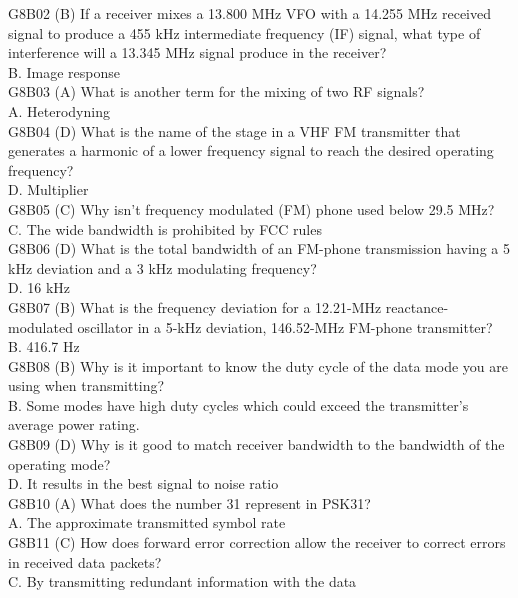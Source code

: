 \documentclass[12pt,letterpaper]{report}
\begin{document}
G8B02 (B) If a receiver mixes a 13.800 MHz VFO with a 14.255 MHz received signal to produce a 455 kHz intermediate frequency (IF) signal, what type of interference will a 13.345 MHz signal produce in the receiver?\\
B. Image response\\

G8B03 (A) What is another term for the mixing of two RF signals?\\
A. Heterodyning\\

G8B04 (D) What is the name of the stage in a VHF FM transmitter that generates a harmonic of a lower frequency signal to reach the desired operating frequency?\\
D. Multiplier\\

G8B05 (C) Why isn't frequency modulated (FM) phone used below 29.5 MHz?\\
C. The wide bandwidth is prohibited by FCC rules\\

G8B06 (D) What is the total bandwidth of an FM-phone transmission having a 5 kHz
deviation and a 3 kHz modulating frequency?\\
D. 16 kHz\\

G8B07 (B) What is the frequency deviation for a 12.21-MHz reactance-modulated oscillator in a 5-kHz deviation, 146.52-MHz FM-phone transmitter?\\
B. 416.7 Hz\\

G8B08 (B) Why is it important to know the duty cycle of the data mode you are using when transmitting?\\
B. Some modes have high duty cycles which could exceed the transmitter's average power rating.\\

G8B09 (D) Why is it good to match receiver bandwidth to the bandwidth of the operating mode?\\
D. It results in the best signal to noise ratio\\

G8B10 (A) What does the number 31 represent in PSK31?\\
A. The approximate transmitted symbol rate\\

G8B11 (C) How does forward error correction allow the receiver to correct errors in received data packets?\\
C. By transmitting redundant information with the data\\
\end{document}
